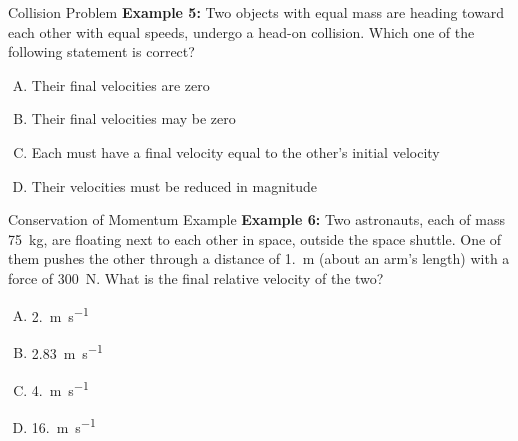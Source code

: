 \documentclass[12pt,compress,aspectratio=169]{beamer}
\begin{document}
%






\begin{frame}{Collision Problem}
  \textbf{Example 5:} Two objects with equal mass are heading toward each
  other with equal speeds, undergo a head-on collision. Which one of the
  following statement is correct?

  \vspace{.15in}\begin{enumerate}[A.]
  \item Their final velocities are zero
  \item Their final velocities may be zero
  \item Each must have a final velocity equal to the other's initial velocity
  \item Their velocities must be reduced in magnitude
  \end{enumerate}
\end{frame}



\begin{frame}{Conservation of Momentum Example}
  \textbf{Example 6:} Two astronauts, each of mass \SI{75}{\kilo\gram}, are
  floating next to each other in space, outside the space shuttle. One of them
  pushes the other through a distance of \SI{1.}{\metre} (about an arm's
  length) with a force of \SI{300}{\newton}. What is the final relative
  velocity of the two?

  \vspace{.15in}\begin{enumerate}[A.]
  \item \SI{2.}{\metre\per\second}
  \item \SI{2.83}{\metre\per\second}
  \item \SI{4.}{\metre\per\second}
  \item \SI{16.}{\metre\per\second}
  \end{enumerate}
\end{frame}
\end{document}
